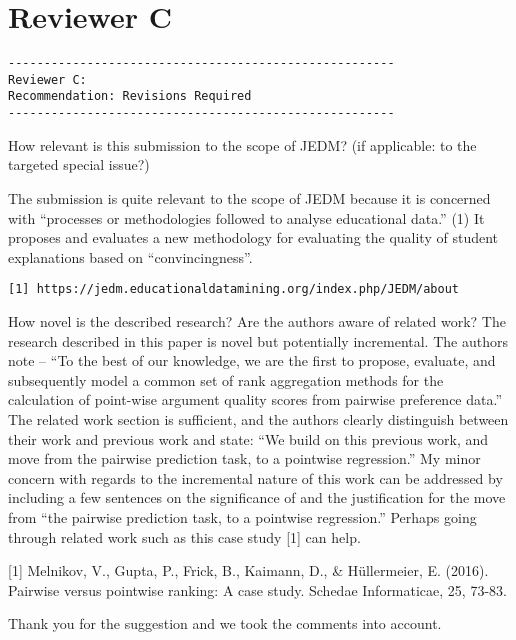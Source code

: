 \documentclass[notitlepage,12pt]{article}
\begin{document}
\section{Reviewer C}

\begin{verbatim}
------------------------------------------------------
Reviewer C:
Recommendation: Revisions Required
------------------------------------------------------
\end{verbatim}

\begin{revcomment}{How relevant is this submission to the scope of JEDM? (if applicable: to the targeted special issue?)}

    The submission is quite relevant to the scope of JEDM because it is concerned with “processes or methodologies followed to analyse educational data.” (1) It proposes and evaluates a new methodology for evaluating the quality of student explanations based on “convincingness”.

    \verb|[1] https://jedm.educationaldatamining.org/index.php/JEDM/about|
\end{revcomment}


\begin{revcomment}{How novel is the described research? Are the authors aware of related work?}
    The research described in this paper is novel but potentially incremental. The authors note -- “To the best of our knowledge, we are the first to propose, evaluate, and subsequently model a common set of rank aggregation methods for the calculation of point-wise argument quality scores from pairwise preference data.” The related work section is sufficient, and the authors clearly distinguish between their work and previous work and state: “We build on this previous work, and move from the pairwise prediction task, to a pointwise regression.” My minor concern with regards to the incremental nature of this work can be addressed by including a few sentences on the significance of and the justification for the move from “the pairwise prediction task, to a pointwise regression.” Perhaps going through related work such as this case study [1] can help.

    [1] Melnikov, V., Gupta, P., Frick, B., Kaimann, D., & Hüllermeier, E. (2016). Pairwise versus pointwise ranking: A case study. Schedae Informaticae, 25, 73-83.

    \begin{authors}
      Thank you for the suggestion and we took the comments into account.
    \end{authors}

\end{revcomment}
\end{document}

